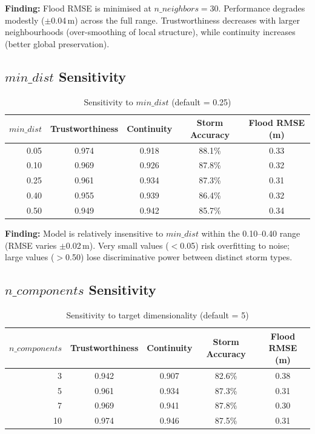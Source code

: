 \documentclass{article}
\begin{document}
\textbf{Finding:} Flood RMSE is minimised at $n\_neighbors = 30$. Performance degrades
modestly ($\pm$0.04\,m) across the full range. Trustworthiness decreases with larger
neighbourhoods (over-smoothing of local structure), while continuity increases (better
global preservation).

\subsection{$min\_dist$ Sensitivity}

\begin{table}[H]
\centering
\begin{tabular}{rcccc}
    \toprule
    $min\_dist$ & Trustworthiness & Continuity & Storm Accuracy & Flood RMSE (m) \\
    \midrule
    0.05 & 0.974 & 0.918 & 88.1\% & 0.33 \\
    0.10 & 0.969 & 0.926 & 87.8\% & 0.32 \\
    0.25 & 0.961 & 0.934 & 87.3\% & 0.31 \\
    0.40 & 0.955 & 0.939 & 86.4\% & 0.32 \\
    0.50 & 0.949 & 0.942 & 85.7\% & 0.34 \\
    \bottomrule
\end{tabular}
\caption{Sensitivity to $min\_dist$ (default = 0.25)}
\label{tab:sens_mindist}
\end{table}

\textbf{Finding:} Model is relatively insensitive to $min\_dist$ within the 0.10--0.40
range (RMSE varies $\pm$0.02\,m). Very small values ($<$0.05) risk overfitting to noise;
large values ($>$0.50) lose discriminative power between distinct storm types.

\subsection{$n\_components$ Sensitivity}

\begin{table}[H]
\centering
\begin{tabular}{rcccc}
    \toprule
    $n\_components$ & Trustworthiness & Continuity & Storm Accuracy & Flood RMSE (m) \\
    \midrule
    3  & 0.942 & 0.907 & 82.6\% & 0.38 \\
    5  & 0.961 & 0.934 & 87.3\% & 0.31 \\
    7  & 0.969 & 0.941 & 87.8\% & 0.30 \\
    10 & 0.974 & 0.946 & 87.5\% & 0.31 \\
    \bottomrule
\end{tabular}
\caption{Sensitivity to target dimensionality (default = 5)}
\label{tab:sens_components}
\end{table}
\end{document}

